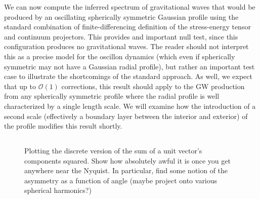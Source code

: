 \documentclass{revtex4}
\begin{document}
We can now compute the inferred spectrum of gravitational waves that would be produced by an oscillating spherically symmetric Gaussian profile using the standard combination of finite-differencing definition of the stress-energy tensor and continuum projectors.
This provides and important null test, since this configuration produces no gravitational waves.
The reader should not interpret this as a precise model for the oscillon dynamics (which even if spherically symmetric may not have a Gaussian radial profile), but rather an important test case to illustrate the shortcomings of the standard approach.
As well, we expect that up to $\mathcal{O}(1)$ corrections, this result should apply to the GW production from any spherically symmetric profile where the radial profile is well characterized by a single length scale.
We will examine how the introduction of a second scale (effectively a boundary layer between the interior and exterior) of the profile modifies this result shortly.

\subsection{}

\begin{figure}
  \caption{Plotting the discrete version of the sum of a unit vector's components squared.  Show how absolutely awful it is once you get anywhere near the Nyquist.  In particular, find some notion of the asymmetry as a function of angle (maybe project onto various spherical harmonics?)}
\end{figure}
\end{document}

